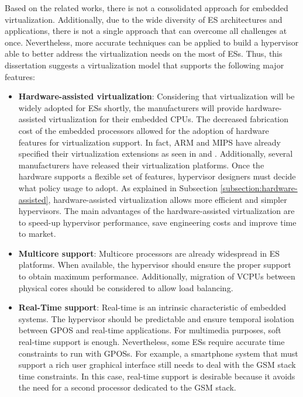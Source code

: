 Based on the related works, there is not a consolidated approach for embedded virtualization. Additionally, due to the wide diversity of ES architectures and applications, there is not a single approach that can overcome all challenges at once. Nevertheless, more accurate techniques can be applied to build a hypervisor able to better address the virtualization needs on the most of ESs. Thus, this dissertation suggests a virtualization model that supports the following major features:

\begin{itemize}
\item \textbf{Hardware-assisted virtualization}: Considering that virtualization will be widely adopted for ESs shortly, the manufacturers will provide hardware-assisted virtualization for their embedded CPUs. The decreased fabrication cost of the embedded processors allowed for the adoption of hardware features for virtualization support. In fact, ARM and MIPS have already specified their  virtualization extensions as seen in \cite{armvt} and \cite{mipsvz}. Additionally, several manufacturers have released their virtualization platforms. Once the hardware supports a flexible set of features, hypervisor designers must decide what policy usage to adopt. As explained in Subsection \ref{subsection:hardware-assisted}, hardware-assisted virtualization allows more efficient and simpler hypervisors. The main advantages of the hardware-assisted virtualization are to speed-up hypervisor performance, save engineering costs and improve time to market.

\item \textbf{Multicore support}: Multicore processors are already widespread in ES platforms. When available, the hypervisor should ensure the proper support to obtain maximum performance. Additionally, migration of VCPUs between physical cores should be considered to allow load balancing. 

\item \textbf{Real-Time support}: Real-time is an intrinsic characteristic of embedded systems. The hypervisor should be predictable and ensure temporal isolation between GPOS and real-time applications. For multimedia purposes, soft real-time support is enough. Nevertheless, some ESs require accurate time constraints to run with GPOSs. For example, a smartphone system that must support a rich user graphical interface still needs to deal with the GSM stack \cite{appleton1998} time constraints. In this case, real-time support is desirable because it avoids the need for a second processor dedicated to the GSM stack.


\end{itemize}

